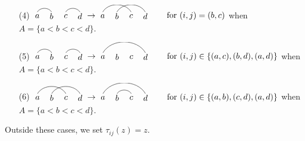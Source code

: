 \documentclass[10pt]{article}
\begin{document}
\begin{definition}
\begin{itemize}
\item[(4)]
$
\begin{tikzpicture}[baseline=-2pt,scale=0.6]
\node at (0,0) {$a$};
\node at (1,0) {$b$};
\node at (2,0) {$c$};
\node at (3,0) {$d$};
\draw [transform canvas={yshift=5pt}] (0,0) to[out=60,in=120] (1,0);
\draw [transform canvas={yshift=5pt}] (2,0) to[out=60,in=120] (3,0);
\end{tikzpicture}
\rightarrow
\begin{tikzpicture}[baseline=-2pt,scale=0.6]
\node at (0,0) {$a$};
\node at (1,0) {$b$};
\node at (2,0) {$c$};
\node at (3,0) {$d$};
\draw [transform canvas={yshift=5pt}] (0,0) to[out=60,in=120] (2,0);
\draw [transform canvas={yshift=5pt}] (1,0) to[out=60,in=120] (3,0);
\end{tikzpicture}
\qquad\text{for }(i,j)=(b,c)$ when $A=\{a<b<c<d\}$.

\item[(5)] $
\begin{tikzpicture}[baseline=-2pt,scale=0.6]
\node at (0,0) {$a$};
\node at (1,0) {$b$};
\node at (2,0) {$c$};
\node at (3,0) {$d$};
\draw [transform canvas={yshift=5pt}] (0,0) to[out=60,in=120] (1,0);
\draw [transform canvas={yshift=5pt}] (2,0) to[out=60,in=120] (3,0);
\end{tikzpicture}
\rightarrow
\begin{tikzpicture}[baseline=-2pt,scale=0.6]
\node at (0,0) {$a$};
\node at (1,0) {$b$};
\node at (2,0) {$c$};
\node at (3,0) {$d$};
\draw [transform canvas={yshift=5pt}] (0,0) to[out=60,in=120] (3,0);
\end{tikzpicture}
\qquad\text{for }(i,j)\in\{(a,c),(b,d),(a,d)\}$ when $A=\{a<b<c<d\}$.

\item[(6)]
$
\begin{tikzpicture}[baseline=-2pt,scale=0.6]
\node at (0,0) {$a$};
\node at (1,0) {$b$};
\node at (2,0) {$c$};
\node at (3,0) {$d$};
\draw [transform canvas={yshift=5pt}] (0,0) to[out=60,in=120] (2,0);
\draw [transform canvas={yshift=5pt}] (1,0) to[out=60,in=120] (3,0);
\end{tikzpicture}
\rightarrow
\begin{tikzpicture}[baseline=-2pt,scale=0.6]
\node at (0,0) {$a$};
\node at (1,0) {$b$};
\node at (2,0) {$c$};
\node at (3,0) {$d$};
\draw [transform canvas={yshift=5pt}] (0,0) to[out=60,in=120] (3,0);
\draw [transform canvas={yshift=5pt}] (1,0) to[out=60,in=120] (2,0);
\end{tikzpicture}
\qquad\text{for }(i,j)\in\{(a,b),(c,d),(a,d)\}$ when $A=\{a<b<c<d\}$.
\end{itemize}
Outside these cases, we 
set $\tau_{ij}(z)=z$.
\end{definition}
\end{document}
